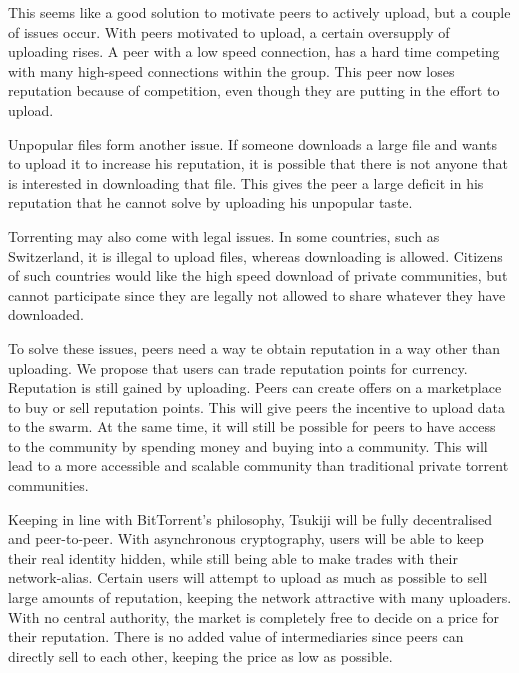 This seems like a good solution to motivate peers to actively upload, but a couple of issues occur.\cite{bartercast}
With peers motivated to upload, a certain oversupply of uploading rises.
A peer with a low speed connection, has a hard time competing with many high-speed connections within the group.
This peer now loses reputation because of competition, even though they are putting in the effort to upload.

Unpopular files form another issue.
If someone downloads a large file and wants to upload it to increase his reputation, it is possible that there is not anyone that is interested in downloading that file.
This gives the peer a large deficit in his reputation that he cannot solve by uploading his unpopular taste.

Torrenting may also come with legal issues.
In some countries, such as Switzerland\cite{switzerland}, it is illegal to upload files, whereas downloading is allowed.
Citizens of such countries would like the high speed download of private communities, but cannot participate since they are legally not allowed to share whatever they have downloaded.

To solve these issues, peers need a way te obtain reputation in a way other than uploading.
We propose that users can trade reputation points for currency.
Reputation is still gained by uploading.
Peers can create offers on a marketplace to buy or sell reputation points.
This will give peers the incentive to upload data to the swarm.
At the same time, it will still be possible for peers to have access to the community by spending money and buying into a community.
This will lead to a more accessible and scalable community than traditional private torrent communities.

Keeping in line with BitTorrent's philosophy, Tsukiji will be fully decentralised and peer-to-peer.
With asynchronous cryptography, users will be able to keep their real identity hidden, while still being able to make trades with their network-alias.
Certain users will attempt to upload as much as possible to sell large amounts of reputation, keeping the network attractive with many uploaders.
With no central authority, the market is completely free to decide on a price for their reputation.
There is no added value of intermediaries since peers can directly sell to each other, keeping the price as low as possible.


